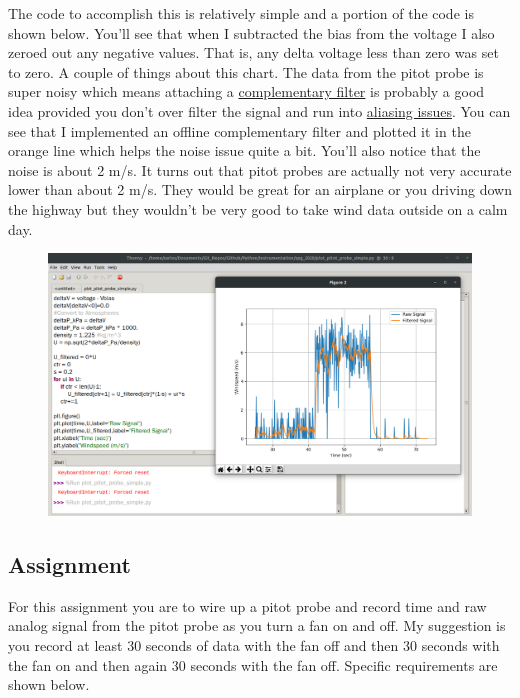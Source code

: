 The code to accomplish this is relatively simple and a portion of the code is shown below. You’ll see that when I subtracted the bias from the voltage I also zeroed out any negative values. That is, any delta voltage less than zero was set to zero. A couple of things about this chart. The data from the pitot probe is super noisy which means attaching a \href{https://youtu.be/zTGa4sk6UZE}{complementary filter} is probably a good idea provided you don’t over filter the signal and run into \href{https://youtu.be/8F_8st_8MmA}{aliasing issues}. You can see that I implemented an offline complementary filter and plotted it in the orange line which helps the noise issue quite a bit. You’ll also notice that the noise is about 2 m/s. It turns out that pitot probes are actually not very accurate lower than about 2 m/s. They would be great for an airplane or you driving down the highway but they wouldn’t be very good to take wind data outside on a calm day.
\begin{figure}[H]
  \begin{center}
    \includegraphics[width=\textwidth]{Figures/pitot_probe_final.png}
  \end{center}
\end{figure}

\subsection{Assignment}

For this assignment you are to wire up a pitot probe and record time and raw analog signal from the pitot probe as you turn a fan on and off. My suggestion is you record at least 30 seconds of data with the fan off and then 30 seconds with the fan on and then again 30 seconds with the fan off. Specific requirements are shown below.

